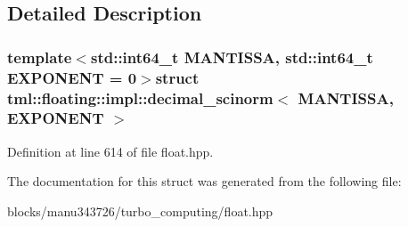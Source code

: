 \subsection{Detailed Description}
\subsubsection*{template$<$std\+::int64\+\_\+t M\+A\+N\+T\+I\+S\+S\+A, std\+::int64\+\_\+t E\+X\+P\+O\+N\+E\+N\+T = 0$>$struct tml\+::floating\+::impl\+::decimal\+\_\+scinorm$<$ M\+A\+N\+T\+I\+S\+S\+A, E\+X\+P\+O\+N\+E\+N\+T $>$}



Definition at line 614 of file float.\+hpp.



The documentation for this struct was generated from the following file\+:\begin{DoxyCompactItemize}
\item 
blocks/manu343726/turbo\+\_\+computing/float.\+hpp\end{DoxyCompactItemize}
